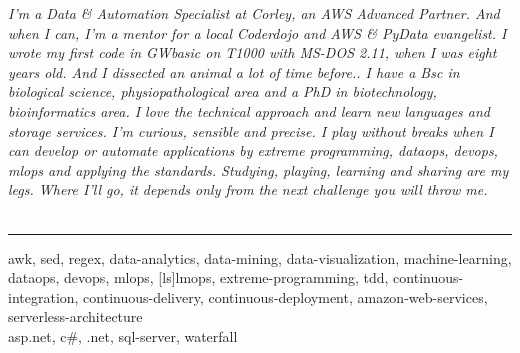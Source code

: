\documentclass[9pt]{stackoverflow} %
\begin{document}
\begin{minipage}[t]{0.1\textwidth}\vspace{\baselineskip}\hfill\end{minipage}
\begin{minipage}[t]{0.8\textwidth} %
	\vspace{\baselineskip} %
	\vspace{\baselineskip} %
	{\normalsize\emph{I'm a Data \& Automation Specialist at Corley, an AWS Advanced Partner.
	And when I can, I'm a mentor for a local Coderdojo and AWS \& PyData evangelist.
	I wrote my first code in GWbasic on T1000 with MS-DOS 2.11, when I was eight years old. And I dissected an animal a lot of time before..
	I have a Bsc in biological science, physiopathological area and a PhD in biotechnology, bioinformatics area.
	I love the technical approach and learn new languages and storage services. I'm curious, sensible and precise.
	I play without breaks when I can develop or automate applications by extreme programming, dataops, devops, mlops and applying the standards.
	Studying, playing, learning and sharing are my legs. Where I'll go, it depends only from the next challenge you will throw me.
	}}\\\\
\end{minipage}
\begin{minipage}[t]{0.1\textwidth}\vspace{\baselineskip}\end{minipage}


\textcolor{stackoverflow}{\hrule}
\begin{minipage}[t]{0.25\textwidth}
	\vspace{\baselineskip} %
\end{minipage}
\begin{minipage}[t]{0.75\textwidth}
	\vspace{\baselineskip} %
	{\small
			{awk, sed, regex, data-analytics, data-mining, data-visualization, machine-learning, dataops, devops, mlops, [ls]lmops, extreme-programming, tdd, continuous-integration, continuous-delivery, continuous-deployment, amazon-web-services, serverless-architecture\\}
			{asp.net, c\#, .net, sql-server, waterfall}
	}
\end{minipage}
\end{document}

